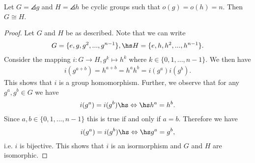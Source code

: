 \documentclass{article}
\begin{document}
\begin{lemma*}
	Let $G=\angles{g}$ and $H=\angles{h}$ be cyclic groups such that
	$o(g)=o(h)=n$. Then $G\cong H$.
\end{lemma*}

\begin{proof}
	Let $G$ and $H$ be as described. Note that we can write
	\begin{align*}
		G=\{e, g, g^2, ..., g^{n-1}\},\hs
		H=\{e, h, h^2, ..., h^{n-1}\}.
	\end{align*}
	Consider the mapping $i:G\to H, g^k\mapsto h^k$ where
	$k\in\{0,1,...,n-1\}$. We then have
	\begin{align*}
		i(g^{a+b}) = h^{a+b} = h^a h^b = i(g^a)i(g^b).
	\end{align*}
	This shows that $i$ is a group homomorphism. Further, we observe
	that for any $g^a,g^b\in G$ we have
	\begin{align*}
		i(g^a) = i(g^b) \hs\Leftrightarrow\hs h^a=h^b.
	\end{align*}
	Since $a,b\in\{0,1,...,n-1\}$ this is true if and only if $a=b$.
	Therefore we have
	\begin{align*}
		i(g^a) = i(g^b) \hs\Leftrightarrow\hs g^a = g^b,
	\end{align*}
	i.e. $i$ is bijective. This shows that $i$ is an isormorphism
	and $G$ and $H$ are isomorphic.
\end{proof}
\end{document}

